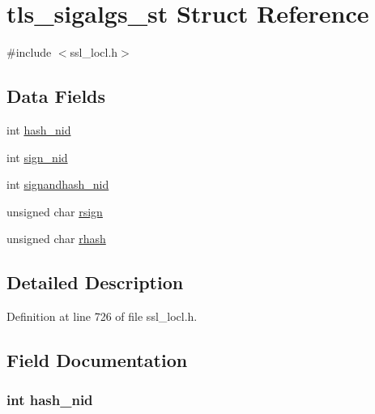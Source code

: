 \hypertarget{structtls__sigalgs__st}{}\section{tls\+\_\+sigalgs\+\_\+st Struct Reference}
\label{structtls__sigalgs__st}


{\ttfamily \#include $<$ssl\+\_\+locl.\+h$>$}

\subsection*{Data Fields}
\begin{DoxyCompactItemize}
\item 
int \hyperlink{structtls__sigalgs__st_aabb9f2ecaf86cfff7e7a8b621a8fddf1}{hash\+\_\+nid}
\item 
int \hyperlink{structtls__sigalgs__st_aafb153cff89c5e6913e7b2365e381043}{sign\+\_\+nid}
\item 
int \hyperlink{structtls__sigalgs__st_a141706c812b5ebef022a22be107e514a}{signandhash\+\_\+nid}
\item 
unsigned char \hyperlink{structtls__sigalgs__st_a303e77c024d90a4a9669ae541f63828c}{rsign}
\item 
unsigned char \hyperlink{structtls__sigalgs__st_a4d59885a854ea907f366834b5322e059}{rhash}
\end{DoxyCompactItemize}


\subsection{Detailed Description}


Definition at line 726 of file ssl\+\_\+locl.\+h.



\subsection{Field Documentation}
\subsubsection[{\texorpdfstring{hash\+\_\+nid}{hash_nid}}]{\setlength{\rightskip}{0pt plus 5cm}int hash\+\_\+nid}\hypertarget{structtls__sigalgs__st_aabb9f2ecaf86cfff7e7a8b621a8fddf1}{}\label{structtls__sigalgs__st_aabb9f2ecaf86cfff7e7a8b621a8fddf1}


